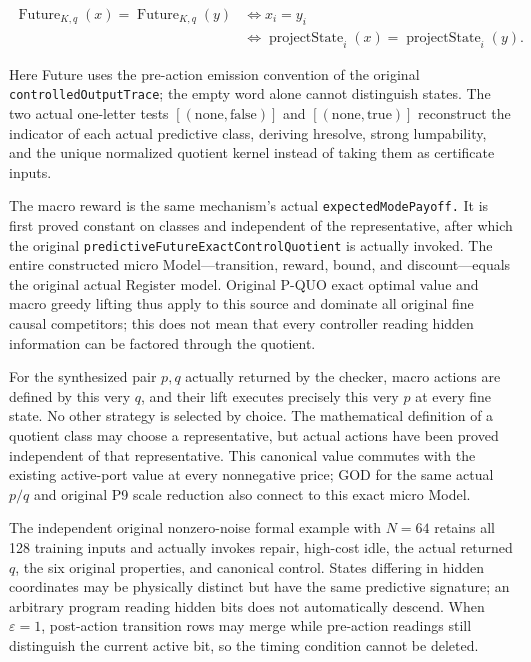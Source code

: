 \documentclass[
  english,
  11pt,
  oneside]{book}
\newcounter{none} %
\begin{document}
\[\begin{aligned}
\operatorname{Future}_{K,q}(x)=\operatorname{Future}_{K,q}(y)
&\Longleftrightarrow x_i=y_i\\
&\Longleftrightarrow
\operatorname{projectState}_i(x)=\operatorname{projectState}_i(y).
\end{aligned}\]

Here Future uses the pre-action emission convention of the original \nolinkurl{controlledOutputTrace}; the empty word alone cannot distinguish states. The two actual one-letter tests \([(\mathrm{none},\mathrm{false})]\) and \([(\mathrm{none},\mathrm{true})]\) reconstruct the indicator of each actual predictive class, deriving hresolve, strong lumpability, and the unique normalized quotient kernel instead of taking them as certificate inputs.

The macro reward is the same mechanism's actual \nolinkurl{expectedModePayoff.} It is first proved constant on classes and independent of the representative, after which the original \nolinkurl{predictiveFutureExactControlQuotient} is actually invoked. The entire constructed micro Model---transition, reward, bound, and discount---equals the original actual Register model. Original P-QUO exact optimal value and macro greedy lifting thus apply to this source and dominate all original fine causal competitors; this does not mean that every controller reading hidden information can be factored through the quotient.

For the synthesized pair \(p,q\) actually returned by the checker, macro actions are defined by this very \(q\), and their lift executes precisely this very \(p\) at every fine state. No other strategy is selected by choice. The mathematical definition of a quotient class may choose a representative, but actual actions have been proved independent of that representative. This canonical value commutes with the existing active-port value at every nonnegative price; GOD for the same actual \(p/q\) and original P9 scale reduction also connect to this exact micro Model.

The independent original nonzero-noise formal example with \(N=64\) retains all 128 training inputs and actually invokes repair, high-cost idle, the actual returned \(q\), the six original properties, and canonical control. States differing in hidden coordinates may be physically distinct but have the same predictive signature; an arbitrary program reading hidden bits does not automatically descend. When \(\varepsilon=1\), post-action transition rows may merge while pre-action readings still distinguish the current active bit, so the timing condition cannot be deleted.
\end{document}
